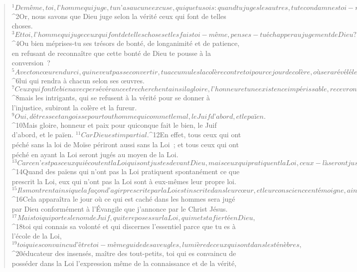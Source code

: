          
      \bchapter{}
      \begin{verse}
${}^{1}De même, toi, l’homme qui juge, tu n’as aucune excuse, qui que tu sois : quand tu juges les autres, tu te condamnes toi-même car tu fais comme eux, toi qui juges. 
${}^{2}Or, nous savons que Dieu juge selon la vérité ceux qui font de telles choses. 
${}^{3}Et toi, l’homme qui juge ceux qui font de telles choses et les fais toi-même, penses-tu échapper au jugement de Dieu ? 
${}^{4}Ou bien méprises-tu ses trésors de bonté, de longanimité et de patience, en refusant de reconnaître que cette bonté de Dieu te pousse à la conversion ? 
${}^{5}Avec ton cœur endurci, qui ne veut pas se convertir, tu accumules la colère contre toi pour ce jour de colère, où sera révélé le juste jugement de Dieu, 
${}^{6}lui qui rendra à chacun selon ses œuvres. 
${}^{7}Ceux qui font le bien avec persévérance et recherchent ainsi la gloire, l’honneur et une existence impérissable, recevront la vie éternelle ; 
${}^{8}mais les intrigants, qui se refusent à la vérité pour se donner à l’injustice, subiront la colère et la fureur. 
${}^{9}Oui, détresse et angoisse pour tout homme qui commet le mal, le Juif d’abord, et le païen. 
${}^{10}Mais gloire, honneur et paix pour quiconque fait le bien, le Juif d’abord, et le païen. 
${}^{11}Car Dieu est impartial.
${}^{12}En effet, tous ceux qui ont péché sans la loi de Moïse périront aussi sans la Loi ; et tous ceux qui ont péché en ayant la Loi seront jugés au moyen de la Loi. 
${}^{13}Car ce n’est pas ceux qui écoutent la Loi qui sont justes devant Dieu, mais ceux qui pratiquent la Loi, ceux-là seront justifiés. 
${}^{14}Quand des païens qui n’ont pas la Loi pratiquent spontanément ce que prescrit la Loi, eux qui n’ont pas la Loi sont à eux-mêmes leur propre loi. 
${}^{15}Ils montrent ainsi que la façon d’agir prescrite par la Loi est inscrite dans leur cœur, et leur conscience en témoigne, ainsi que les arguments par lesquels ils se condamnent ou s’approuvent les uns les autres. 
${}^{16}Cela apparaîtra le jour où ce qui est caché dans les hommes sera jugé par Dieu conformément à l’Évangile que j’annonce par le Christ Jésus.
${}^{17}Mais toi qui portes le nom de Juif, qui te reposes sur la Loi, qui mets ta fierté en Dieu, 
${}^{18}toi qui connais sa volonté et qui discernes l’essentiel parce que tu es à l’école de la Loi, 
${}^{19}toi qui es convaincu d’être toi-même guide des aveugles, lumière de ceux qui sont dans les ténèbres, 
${}^{20}éducateur des insensés, maître des tout-petits, toi qui es convaincu de posséder dans la Loi l’expression même de la connaissance et de la vérité, 

\end{verse}
